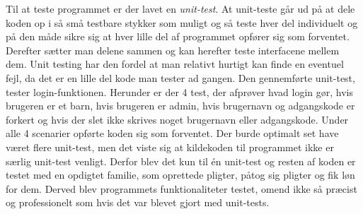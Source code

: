 Til at teste programmet er der lavet en \textit{unit-test}. At unit-teste går ud på at dele koden op i så små testbare stykker som muligt og så teste hver del individuelt og på den måde sikre sig at hver lille del af programmet opfører sig som forventet. Derefter sætter man delene sammen og kan herefter teste interfacene mellem dem.
Unit testing har den fordel at man relativt hurtigt kan finde en eventuel fejl, da det er en lille del kode man tester ad gangen. 
Den gennemførte unit-test, tester login-funktionen. Herunder er der 4 test, der afprøver hvad login gør, hvis brugeren er et barn, hvis brugeren er admin, hvis brugernavn og adgangskode er forkert og hvis der slet ikke skrives noget brugernavn eller adgangskode. Under alle 4 scenarier opførte koden sig som forventet. Der burde optimalt set have været flere unit-test, men det viste sig at kildekoden til programmet ikke er særlig unit-test venligt. Derfor blev det kun til én unit-test og resten af koden er testet med en opdigtet familie, som oprettede pligter, påtog sig pligter og fik løn for dem. Derved blev programmets funktionaliteter testet, omend ikke så præcist og professionelt som hvis det var blevet gjort med unit-tests. 

